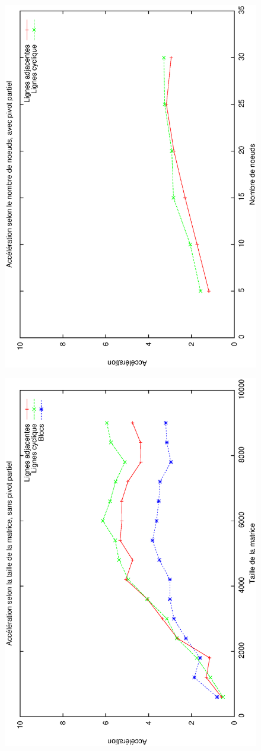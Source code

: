 \documentclass[12pt,letterpaper]{article} %
\begin{document}
\begin{figure}[h!]
\begin{center}
\includegraphics[angle=-90, width=0.65\linewidth]{noeuds_pivot.eps}
\end{center}
\end{figure}
\begin{figure}[h!]
\begin{center}
\includegraphics[angle=-90, width=0.65\linewidth]{taille.eps}
\end{center}
\end{figure}
\end{document}
